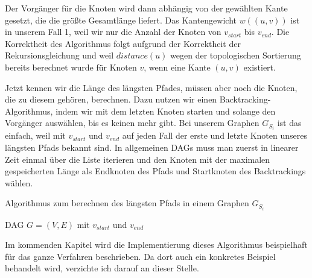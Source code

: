 Der Vorgänger für die Knoten wird dann abhängig von der gewählten Kante gesetzt, die die größte Gesamtlänge liefert. Das Kantengewicht $w((u,v))$ ist in unserem Fall 1, weil wir nur die Anzahl der Knoten von $v_{start}$ bis $v_{end}$. Die Korrektheit des Algorithmus folgt aufgrund der Korrektheit der Rekursionsgleichung und weil $distance(u)$ wegen der topologischen Sortierung bereits berechnet wurde für Knoten $v$, wenn eine Kante $(u,v)$ existiert.

Jetzt kennen wir die Länge des längsten Pfades, müssen aber noch die Knoten, die zu diesem gehören, berechnen. Dazu nutzen wir einen Backtracking-Algorithmus, indem wir mit dem letzten Knoten starten und solange den Vorgänger auswählen, bis es keinen mehr gibt. Bei unserem Graphen $G_{S_i}$ ist das einfach, weil mit $v_{start}$ und $v_{end}$ auf jeden Fall der erste und letzte Knoten unseres längsten Pfads bekannt sind. In allgemeinen DAGs muss man zuerst in linearer Zeit einmal über die Liste iterieren und den Knoten mit der maximalen gespeicherten Länge als Endknoten des Pfads und Startknoten des Backtrackings wählen.

\begin{algorithm}
	\caption{Algorithmus zum berechnen des längsten Pfads in einem Graphen $G_{S_i}$}
	\label{alg:longestpath}
	\begin{algorithmic}[1]
		\Require DAG $G = (V,E)$ mit $v_{start}$ und $v_{end}$
			 
			\EndWhile
			 
			 
			\EndWhile
		\EndProcedure
	\end{algorithmic}
\end{algorithm}

Im kommenden Kapitel wird die Implementierung dieses Algorithmus beispielhaft für das ganze Verfahren beschrieben. Da dort auch ein konkretes Beispiel behandelt wird, verzichte ich darauf an dieser Stelle.


